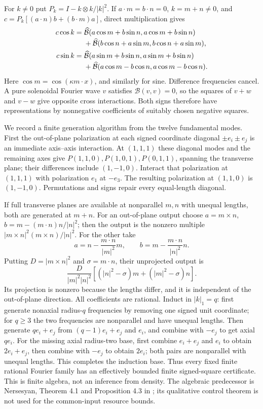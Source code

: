 \documentclass[11pt,a4paper]{amsart}
\theoremstyle{definition}
\theoremstyle{remark}
\numberwithin{equation}{section}
\newcommand{\Bcal}{\mathcal B}
\newcommand{\Bhat}{\widehat{\Bcal}}
\begin{document}
For $k\ne0$ put $P_k=I-k\otimes k/|k|^2$. If
$a\cdot m=b\cdot n=0$, $k=m+n\ne0$, and
$c=P_k[(a\cdot n)b+(b\cdot m)a]$, direct multiplication gives
\begin{align}
 c\cos k={}&\Bhat(a\cos m+b\sin n,a\cos m+b\sin n)
 \notag\\[-2pt]
 &+\Bhat(b\cos n+a\sin m,b\cos n+a\sin m),\label{cmp:cos-square}\\
 c\sin k={}&\Bhat(a\sin m+b\sin n,a\sin m+b\sin n)
 \notag\\[-2pt]
 &+\Bhat(a\cos m-b\cos n,a\cos m-b\cos n).
 \label{cmp:sin-square}
\end{align}
Here $\cos m=\cos(\kappa m\cdot x)$, and similarly for sine. Difference
frequencies cancel. A pure solenoidal Fourier wave $v$ satisfies
$\Bcal(v,v)=0$, so the squares of $v+w$ and $v-w$ give opposite cross
interactions. Both signs therefore have representations by nonnegative
coefficients of suitably chosen negative squares.

We record a finite generation algorithm from the twelve fundamental modes.
First the out-of-plane polarization at each signed coordinate diagonal
$\pm e_i\pm e_j$ is an immediate axis--axis interaction. At $(1,1,1)$
these diagonal modes and the remaining axes give
$P(1,1,0),P(1,0,1),P(0,1,1)$, spanning the transverse plane; their
differences include $(1,-1,0)$. Interact that polarization at $(1,1,1)$
with polarization $e_1$ at $-e_3$. The resulting polarization at $(1,1,0)$
is $(1,-1,0)$. Permutations and signs repair every equal-length diagonal.

If full transverse planes are available at nonparallel $m,n$ with unequal
lengths, both are generated at $m+n$. For an out-of-plane output choose $a=m\times n$, $b=m-(m\cdot n)n/|n|^2$; then the output is the nonzero multiple $|m\times n|^2(m\times n)/|n|^2$.
For the other take
\[
 a=n-\frac{m\cdot n}{|m|^2}m,\qquad
 b=m-\frac{m\cdot n}{|n|^2}n.
\]
Putting $D=|m\times n|^2$ and $\sigma=m\cdot n$, their unprojected output is
\[
 \frac{D}{|m|^2|n|^2}
       [ (|n|^2-\sigma)m+(|m|^2-\sigma)n].
\]
Its projection is nonzero because the lengths differ, and it is independent
of the out-of-plane direction. All coefficients are rational.
Induct in $|k|_1=q$: first generate nonaxial radius-$q$ frequencies by
removing one signed unit coordinate; for $q\ge3$ the two frequencies are
nonparallel and have unequal lengths. Then generate $q e_i+e_j$ from
$(q-1)e_i+e_j$ and $e_i$, and combine with $-e_j$ to get axial $q e_i$.
For the missing axial radius-two base, first combine $e_i+e_j$ and $e_i$ to obtain $2e_i+e_j$, then combine with $-e_j$ to obtain $2e_i$; both pairs are nonparallel with unequal lengths. This completes the induction base. Thus every fixed finite rational
Fourier family has an effectively bounded finite signed-square certificate.
This is finite algebra, not an inference from density. The algebraic
predecessor is Nersesyan, Theorem 4.1 and Proposition 4.3 in
\cite{Nersesyan2015}; its qualitative control theorem is not used for
the common-input resource bounds.
\end{document}

